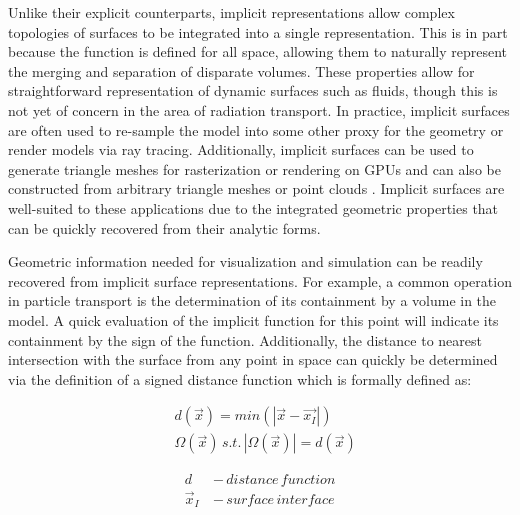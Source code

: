 Unlike their explicit counterparts, implicit representations allow complex
topologies of surfaces to be integrated into a single representation. This is in
part because the function is defined for all space, allowing them to naturally
represent the merging and separation of disparate volumes. These properties
allow for straightforward representation of dynamic surfaces such as fluids,
though this is not yet of concern in the area of radiation transport. In
practice, implicit surfaces are often used to re-sample the model into some
other proxy for the geometry or render models via ray tracing. Additionally,
implicit surfaces can be used to generate triangle meshes for rasterization or
rendering on GPUs \cite{Sethian_1996} and can also be constructed from arbitrary
triangle meshes or point clouds \cite{Sigg_2006}. Implicit surfaces are
well-suited to these applications due to the integrated geometric properties
that can be quickly recovered from their analytic forms.

Geometric information needed for visualization and simulation can be
readily recovered from implicit surface representations. For example, a common
operation in particle transport is the determination of its containment by a
volume in the model. A quick evaluation of the implicit function for this point
will indicate its containment by the sign of the function.
Additionally, the distance to nearest intersection with the surface from any
point in space can quickly be determined via the definition of a signed distance
function which is formally defined as:

\begin{align} \label{eq:sdf}
  & d(\vec{x}) = min(|\vec{x} - \vec{x_{I}}|) \\
  & \Omega(\vec{x})  \,s.t.  \, |\Omega(\vec{x})| = d(\vec{x})
\end{align}

\begin{align}
  d \, &- \, distance \, function \\
  \vec{x}_{I} \, &- \,surface \, interface
\end{align}

\noindent

